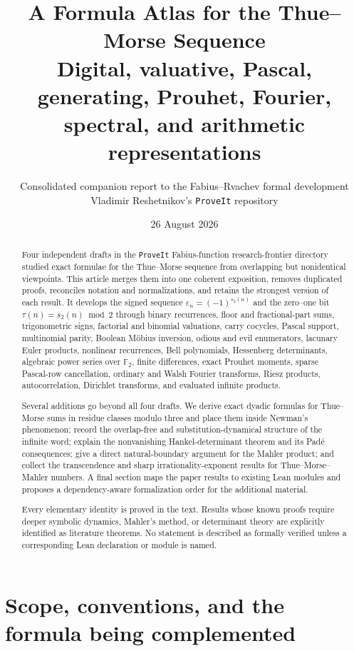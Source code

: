 \documentclass[11pt,oneside]{article}
\title{\bfseries A Formula Atlas for the Thue--Morse Sequence\\[0.35em]
\large Digital, valuative, Pascal, generating, Prouhet, Fourier, spectral, and arithmetic representations}
\author{Consolidated companion report to the Fabius--Rvachev formal development\\
\small Vladimir Reshetnikov's \texttt{ProveIt} repository}
\date{26 August 2026}
\theoremstyle{definition}
\theoremstyle{remark}
\newcommand{\Ftwo}{\mathbb F_2}
\newcommand{\wt}{s_2}
\newcommand{\eps}{\varepsilon}
\begin{document}
\maketitle

\begin{abstract}
Four independent drafts in the \texttt{ProveIt} Fabius-function research-frontier directory
studied exact formulae for the Thue--Morse sequence from overlapping but nonidentical
viewpoints.  This article merges them into one coherent exposition, removes duplicated
proofs, reconciles notation and normalizations, and retains the strongest version of each
result.  It develops the signed sequence
\(\eps_n=(-1)^{\wt(n)}\) and the zero--one bit
\(\tau(n)=\wt(n)\bmod2\) through binary recurrences, floor and fractional-part sums,
trigonometric signs, factorial and binomial valuations, carry cocycles, Pascal support,
multinomial parity, Boolean M\"obius inversion, odious and evil enumerators, lacunary Euler
products, nonlinear recurrences, Bell polynomials, Hessenberg determinants, algebraic power
series over \(\Ftwo\), finite differences, exact Prouhet moments, sparse Pascal-row
cancellation, ordinary and Walsh Fourier transforms, Riesz products, autocorrelation,
Dirichlet transforms, and evaluated infinite products.

Several additions go beyond all four drafts.  We derive exact dyadic formulas for
Thue--Morse sums in residue classes modulo three and place them inside Newman's phenomenon;
record the overlap-free and substitution-dynamical structure of the infinite word; explain
the nonvanishing Hankel-determinant theorem and its Pad\'e consequences; give a direct
natural-boundary argument for the Mahler product; and collect the transcendence and sharp
irrationality-exponent results for Thue--Morse--Mahler numbers.  A final section maps the
paper results to existing Lean modules and proposes a dependency-aware formalization order
for the additional material.

Every elementary identity is proved in the text.  Results whose known proofs require deeper
symbolic dynamics, Mahler's method, or determinant theory are explicitly identified as
literature theorems.  No statement is described as formally verified unless a corresponding
Lean declaration or module is named.
\end{abstract}

\tableofcontents
\newpage

\section{Scope, conventions, and the formula being complemented}
\label{sec:scope}
\end{document}
